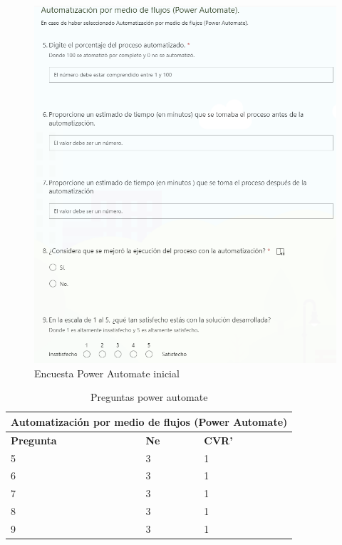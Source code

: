 \begin{figure}[H]
	\centering
	\includegraphics[scale=0.5]{Capitulo5/imagenes/fa}
	\caption{Encuesta Power Automate inicial}
	\label{fig:ea1}
\end{figure}


\begin{table}[H]
	\centering
	\begin{tabular}{|p{3cm}|p{3cm}|p{3cm} |}
		\hline
		\multicolumn{3}{|c|}{Automatización por medio de flujos (Power Automate)} \\
		\hline
		\textbf{Pregunta}& \textbf{Ne}&\textbf{CVR'}\\
		\hline
		5&3&1\\
		\hline
		6&3&1\\
		\hline
		7&3&1\\
		\hline
		8&3&1\\
		\hline
		9&3&1\\
		\hline
		
	\end{tabular}
	\label{tabla:automare}
	\caption{Preguntas power automate}
\end{table}

